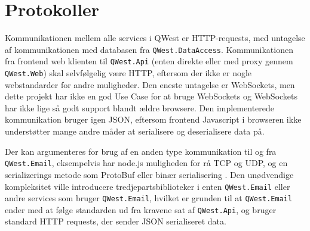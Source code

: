 
\section{Protokoller}\label{sec:protocols}
Kommunikationen mellem alle services i QWest er HTTP-requests, med untagelse af kommunikationen med databasen fra \texttt{QWest.DataAccess}. Kommunikationen fra frontend web klienten til \texttt{QWest.Api} (enten direkte eller med proxy gennem \texttt{QWest.Web}) skal selvfølgelig være HTTP, eftersom der ikke er nogle webstandarder for andre muligheder. Den eneste untagelse er WebSockets, men dette projekt har ikke en god Use Case\cite{Larman2004} for at bruge WebSockets og WebSockets har ikke lige så godt support blandt ældre browsere. Den implementerede kommunikation bruger igen JSON, eftersom frontend Javascript i browseren ikke understøtter mange andre måder at serialisere og deserialisere data på.

Der kan argumenteres for brug af en anden type kommunikation til og fra \texttt{QWest.Email}, eksempelvis har node.js muligheden for rå TCP og UDP, og en serializerings metode som ProtoBuf \cite{ProtoBuf} eller binær serialisering \cite{CsharpBinarySerialization}. Den unødvendige kompleksitet ville introducere tredjepartsbiblioteker i enten \texttt{QWest.Email} eller andre services som bruger \texttt{QWest.Email}, hvilket er grunden til at \texttt{QWest.Email} ender med at følge standarden ud fra kravene sat af \texttt{QWest.Api}, og bruger standard HTTP requests, der sender JSON serialiseret data.


